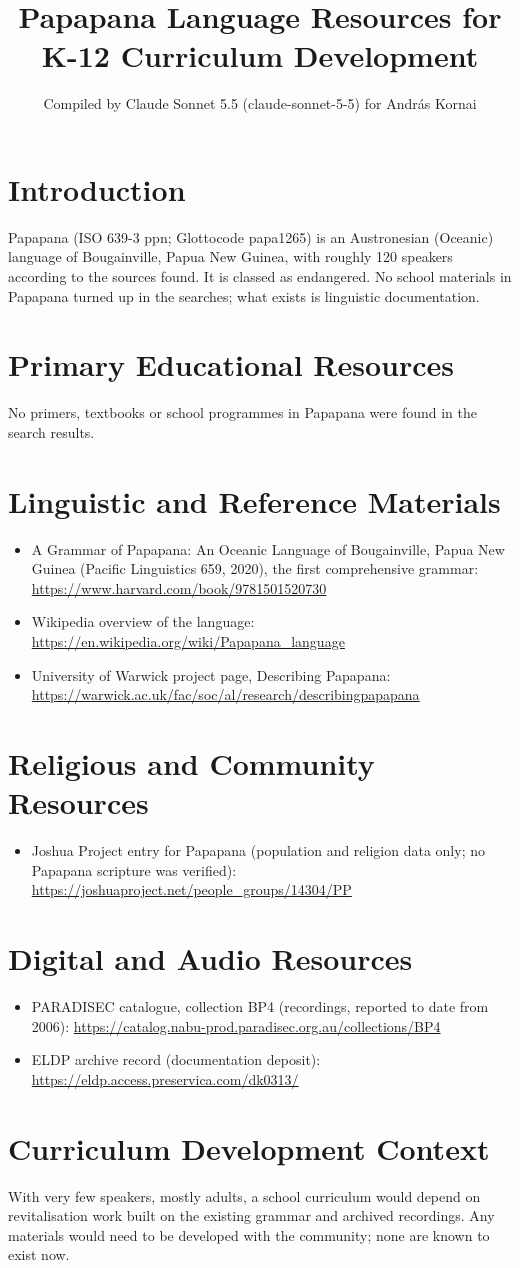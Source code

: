 \documentclass[12pt]{article}
\title{Papapana Language Resources for K-12 Curriculum Development}
\author{Compiled by Claude Sonnet 5.5 (claude-sonnet-5-5) for Andr\'as Kornai}
\date{}
\begin{document}
\maketitle

\section{Introduction}
Papapana (ISO 639-3 ppn; Glottocode papa1265) is an Austronesian (Oceanic) language of Bougainville, Papua New Guinea, with roughly 120 speakers according to the sources found. It is classed as endangered. No school materials in Papapana turned up in the searches; what exists is linguistic documentation.

\section{Primary Educational Resources}
No primers, textbooks or school programmes in Papapana were found in the search results.

\section{Linguistic and Reference Materials}
\begin{itemize}
\item A Grammar of Papapana: An Oceanic Language of Bougainville, Papua New Guinea (Pacific Linguistics 659, 2020), the first comprehensive grammar: \url{https://www.harvard.com/book/9781501520730}
\item Wikipedia overview of the language: \url{https://en.wikipedia.org/wiki/Papapana_language}
\item University of Warwick project page, Describing Papapana: \url{https://warwick.ac.uk/fac/soc/al/research/describingpapapana}
\end{itemize}

\section{Religious and Community Resources}
\begin{itemize}
\item Joshua Project entry for Papapana (population and religion data only; no Papapana scripture was verified): \url{https://joshuaproject.net/people_groups/14304/PP}
\end{itemize}

\section{Digital and Audio Resources}
\begin{itemize}
\item PARADISEC catalogue, collection BP4 (recordings, reported to date from 2006): \url{https://catalog.nabu-prod.paradisec.org.au/collections/BP4}
\item ELDP archive record (documentation deposit): \url{https://eldp.access.preservica.com/dk0313/}
\end{itemize}

\section{Curriculum Development Context}
With very few speakers, mostly adults, a school curriculum would depend on revitalisation work built on the existing grammar and archived recordings. Any materials would need to be developed with the community; none are known to exist now.
\end{document}
